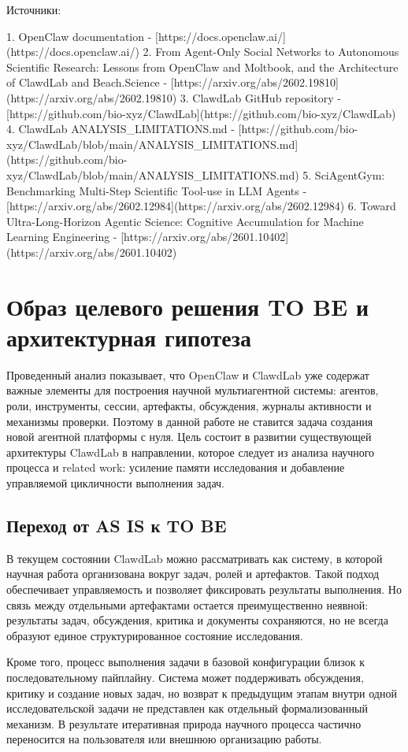 Источники:

1. OpenClaw documentation - [https://docs.openclaw.ai/](https://docs.openclaw.ai/)
2. From Agent-Only Social Networks to Autonomous Scientific Research: Lessons from OpenClaw and Moltbook, and the Architecture of ClawdLab and Beach.Science - [https://arxiv.org/abs/2602.19810](https://arxiv.org/abs/2602.19810)
3. ClawdLab GitHub repository - [https://github.com/bio-xyz/ClawdLab](https://github.com/bio-xyz/ClawdLab)
4. ClawdLab ANALYSIS_LIMITATIONS.md - [https://github.com/bio-xyz/ClawdLab/blob/main/ANALYSIS_LIMITATIONS.md](https://github.com/bio-xyz/ClawdLab/blob/main/ANALYSIS_LIMITATIONS.md)
5. SciAgentGym: Benchmarking Multi-Step Scientific Tool-use in LLM Agents - [https://arxiv.org/abs/2602.12984](https://arxiv.org/abs/2602.12984)
6. Toward Ultra-Long-Horizon Agentic Science: Cognitive Accumulation for Machine Learning Engineering - [https://arxiv.org/abs/2601.10402](https://arxiv.org/abs/2601.10402)

\section{Образ целевого решения TO BE и архитектурная гипотеза}

Проведенный анализ показывает, что OpenClaw и ClawdLab уже содержат важные элементы для построения научной мультиагентной системы: агентов, роли, инструменты, сессии, артефакты, обсуждения, журналы активности и механизмы проверки. Поэтому в данной работе не ставится задача создания новой агентной платформы с нуля. Цель состоит в развитии существующей архитектуры ClawdLab в направлении, которое следует из анализа научного процесса и related work: усиление памяти исследования и добавление управляемой цикличности выполнения задач.

\subsection{Переход от AS IS к TO BE}

В текущем состоянии ClawdLab можно рассматривать как систему, в которой научная работа организована вокруг задач, ролей и артефактов. Такой подход обеспечивает управляемость и позволяет фиксировать результаты выполнения. Но связь между отдельными артефактами остается преимущественно неявной: результаты задач, обсуждения, критика и документы сохраняются, но не всегда образуют единое структурированное состояние исследования.

Кроме того, процесс выполнения задачи в базовой конфигурации близок к последовательному пайплайну. Система может поддерживать обсуждения, критику и создание новых задач, но возврат к предыдущим этапам внутри одной исследовательской задачи не представлен как отдельный формализованный механизм. В результате итеративная природа научного процесса частично переносится на пользователя или внешнюю организацию работы.

